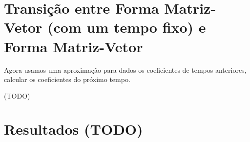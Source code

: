 \documentclass[a4paper]{article}
\begin{document}
\section{Transição entre Forma Matriz-Vetor (com um tempo fixo) e Forma Matriz-Vetor}

Agora usamos uma aproximação para
dados os coeficientes de tempos anteriores,
calcular os coeficientes do próximo tempo.

(TODO)

\section{Resultados (TODO)}

\end{document}
